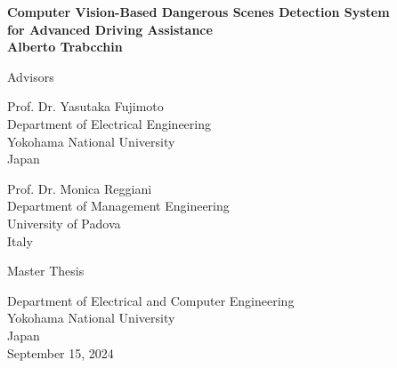 \begin{titlepage}
\begin{center}

\vspace*{1cm}
\textbf{\Large{Computer Vision-Based Dangerous Scenes Detection System}\\ 
        \vspace*{0.2cm}
        \Large{for Advanced Driving Assistance}}\\
\vspace*{2cm}
\textbf{\large{Alberto Trabcchin}}\\
\vfill

\vspace*{4cm}
Advisors \\
\vspace*{1cm}
\begin{minipage}[t]{0.48\textwidth}
    Prof. Dr. Yasutaka Fujimoto \\
    Department of Electrical Engineering\\
    Yokohama National University \\
    Japan

\end{minipage}
\hfill
\begin{minipage}[t]{0.48\textwidth}
\begin{flushright}
    Prof. Dr. Monica Reggiani \\
    Department of Management Engineering \\
    University of Padova \\
    Italy
\end{flushright}
\end{minipage}

\vfill

Master Thesis\\
    
\vspace{0.8cm}

    
Department of Electrical and Computer Engineering\\
Yokohama National University\\
Japan\\
September 15, 2024
            
\end{center}
\end{titlepage}